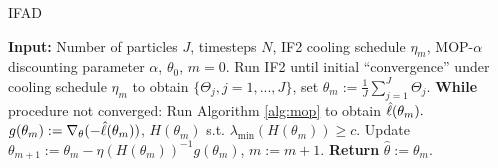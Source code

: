 \documentclass[numsec,webpdf,modern,medium,namedate]{oup-authoring-template}
\theoremstyle{thmstyleone}%
\theoremstyle{thmstyletwo}%
\theoremstyle{thmstylethree}%
\begin{document}



\begin{algorithm}[H]
	\caption{IFAD}
    \label{alg:ifad}
	    \textbf{Input:} Number of particles $J$, timesteps $N$, IF2 cooling schedule $\eta_m$, MOP-$\alpha$ discounting parameter $\alpha$, $\theta_0$, $m=0.$\newline
        Run IF2 until initial ``convergence'' under cooling schedule $\eta_m$ to obtain $\{\Theta_j, j=1,...,J\}$, set $\theta_m := \frac{1}{J}\sum_{j=1}^J \Theta_j.$\newline
		\textbf{While} procedure not converged: \newline
		\hspace*{4mm} Run Algorithm \ref{alg:mop} to obtain $\hat{\ell}(\theta_m).$ \newline
		\hspace*{4mm} $g(\theta_m) := \nabla_{\theta}(-\hat{\ell}(\theta_m))$, $H(\theta_m)$ s.t. $\lambda_{\min}(H(\theta_m)) \geq c$. \newline
		\hspace*{4mm} Update $\theta_{m+1} := \theta_m - \eta (H(\theta_m))^{-1} g(\theta_m)$, $m:=m+1.$ \newline
		\textbf{Return} $\hat{\theta} := \theta_m.$
\end{algorithm}
\end{document}
